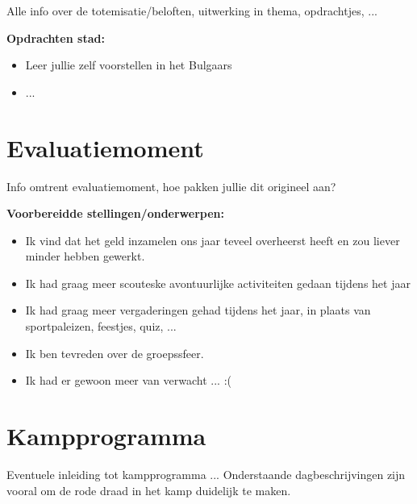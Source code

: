 \documentclass[fleqn,10pt]{src/KampSjabloon}
\begin{document}
Alle info over de totemisatie/beloften, uitwerking in thema, opdrachtjes, ...

\textbf{Opdrachten stad:}

\begin{itemize}

\item Leer jullie zelf voorstellen in het Bulgaars
\item ...

\end{itemize}


\section{Evaluatiemoment}

Info omtrent evaluatiemoment, hoe pakken jullie dit origineel aan?

\textbf{Voorbereidde stellingen/onderwerpen:}

\begin{itemize}

\item Ik vind dat het geld inzamelen ons jaar teveel overheerst heeft en zou liever minder hebben gewerkt.
\item Ik had graag meer scouteske avontuurlijke activiteiten gedaan tijdens het jaar
\item Ik had graag meer vergaderingen gehad tijdens het jaar, in plaats van sportpaleizen, feestjes, quiz, ...
\item Ik ben tevreden over de groepssfeer.
\item Ik had er gewoon meer van verwacht ... :(

\end{itemize}


\section{Kampprogramma}

Eventuele inleiding tot kampprogramma ... Onderstaande dagbeschrijvingen zijn vooral om de rode draad in het kamp duidelijk te maken.
\end{document}
